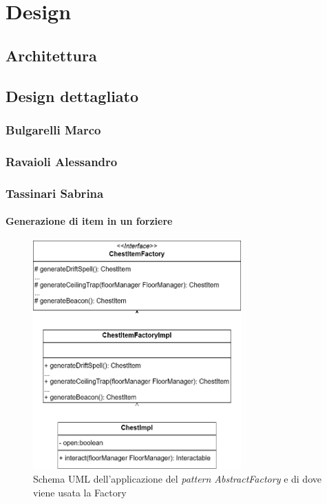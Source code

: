 \documentclass{report}
\begin{document}
\chapter{Design}

\section{Architettura}

\section{Design dettagliato}

\subsection{Bulgarelli Marco}

\subsection{Ravaioli Alessandro}

\subsection{Tassinari Sabrina}

\subsubsection{Generazione di item in un forziere}

\begin{figure}
    \centering
    \includegraphics[width=8cm]{patternFactory.drawio.png}
    \caption{Schema UML dell'applicazione del \textit{pattern AbstractFactory} e di dove viene usata la Factory}
    \label{img:chestItemFactory}
\end{figure}
\end{document}

